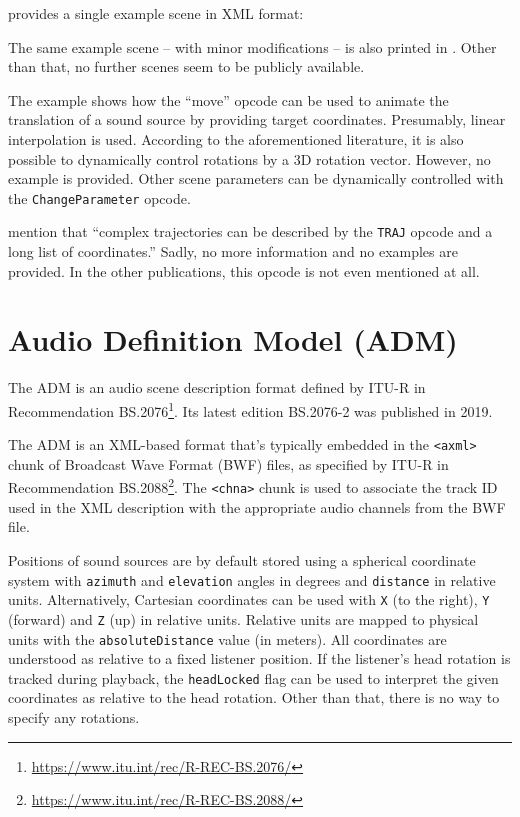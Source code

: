 \textcite[p.\,127]{potard2006object}
provides a single example scene in XML format:


\noindent
The same example scene -- with minor modifications --
is also printed in \parencite[fig.\,5, p.\,4]{potard2004xml}.
Other than that, no further scenes seem to be publicly available.

The example shows how the ``move'' opcode can be used
to animate the translation of a sound source by providing target coordinates.
Presumably, linear interpolation is used.
According to the aforementioned literature,
it is also possible to dynamically control rotations
by a 3D rotation vector.
However, no example is provided.
Other scene parameters can be dynamically controlled with the
\texttt{ChangeParameter} opcode.

\textcite{potard2003encoding} mention that
``complex trajectories can be described by
the \texttt{TRAJ} opcode and a long list of coordinates.''
Sadly, no more information and no examples are provided.
In the other publications, this opcode is not even mentioned at all.


\section{Audio Definition Model (ADM)}
\label{sec:adm}

The ADM is an audio scene description format
defined by ITU-R in Recommendation
BS.2076\footnote{\url{https://www.itu.int/rec/R-REC-BS.2076/}}.
Its latest edition BS.2076-2 was published in 2019.

The ADM is an XML-based format
that's typically embedded
in the \texttt{<axml>} chunk of Broadcast Wave Format (BWF)
files, as specified by ITU-R in Recommendation
BS.2088\footnote{\url{https://www.itu.int/rec/R-REC-BS.2088/}}.
The \texttt{<chna>} chunk is used
to associate the track ID used in the XML description
with the appropriate audio channels from the BWF file.

Positions of sound sources are by default stored
using a spherical coordinate system with
\texttt{azimuth}
and
\texttt{elevation}
angles in degrees and
\texttt{distance}
in relative units.
Alternatively, Cartesian coordinates can be used with
\texttt{X} (to the right),
\texttt{Y} (forward) and
\texttt{Z} (up) in relative units.
Relative units are mapped to physical units with the
\texttt{absoluteDistance} value (in meters).
All coordinates are understood as relative to a fixed listener position.
If the listener's head rotation is tracked during playback,
the \texttt{headLocked} flag can be used to interpret the given
coordinates as relative to the head rotation.
Other than that, there is no way to specify any rotations.

